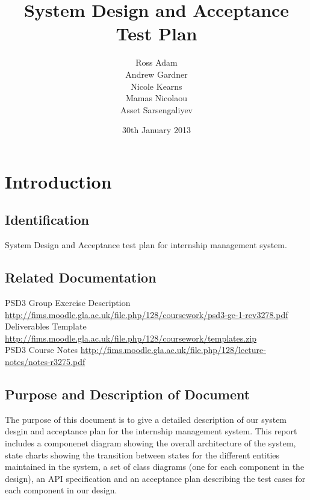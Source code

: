 \documentclass{l3deliverable}
\title{System Design and Acceptance Test Plan}
\author{Ross Adam \\
        Andrew Gardner \\
        Nicole Kearns \\
        Mamas Nicolaou\\
	Asset Sarsengaliyev\\}
\date{30th January 2013}
\begin{document}

\maketitle

\tableofcontents

\newpage


\section{Introduction}

\subsection{Identification}
System Design and Acceptance test plan for internship management system.

\subsection{Related Documentation}

PSD3 Group Exercise Description \url{http://fims.moodle.gla.ac.uk/file.php/128/coursework/psd3-ge-1-rev3278.pdf}\\

Deliverables Template \url{http://fims.moodle.gla.ac.uk/file.php/128/coursework/templates.zip}\\

PSD3 Course Notes \url{http://fims.moodle.gla.ac.uk/file.php/128/lecture-notes/notes-r3275.pdf}\\

\subsection{Purpose and Description of Document}
The purpose of this document is to give a detailed description of our
system desgin and acceptance plan for the internship management system. This report includes a componenet diagram showing the overall architecture of the system, state charts showing the transition between states for the different entities maintained in the system, a set of class diagrams (one for each component in the design), an API specification and an acceptance plan describing the test cases for each component in our design.
\end{document}
